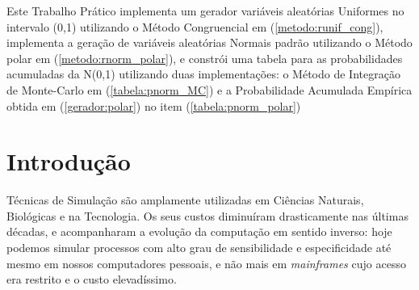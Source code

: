 \documentclass[
	article,			%
	12pt,				%
	twoside,			%
	a4paper,			%
	english,			%
	brazil,				%
	]{abntex2}
\begin{document}
\frenchspacing 


%
%
\maketitle

\begin{resumoumacoluna}
    Este Trabalho Prático implementa um gerador variáveis aleatórias Uniformes no intervalo (0,1) utilizando o Método Congruencial em (\ref{metodo:runif_cong}), implementa a geração de variáveis aleatórias Normais padrão utilizando o Método polar em (\ref{metodo:rnorm_polar}), e constrói uma tabela para as probabilidades acumuladas da N(0,1) utilizando duas implementações: o Método de Integração de Monte-Carlo em (\ref{tabela:pnorm_MC}) e a Probabilidade Acumulada Empírica obtida em (\ref{gerador:polar}) no item (\ref{tabela:pnorm_polar})
 
 \vspace{\onelineskip}
 
 \noindent
\end{resumoumacoluna}


\textual

\section{Introdução}
    Técnicas de Simulação são amplamente utilizadas em Ciências Naturais, Biológicas e na Tecnologia. Os seus custos diminuíram drasticamente nas últimas décadas, e acompanharam a evolução da computação em sentido inverso: hoje podemos simular processos com alto grau de sensibilidade e especificidade até mesmo em nossos computadores pessoais, e não mais em \textit{mainframes} cujo acesso era restrito e o custo elevadíssimo.
    
\end{document}
